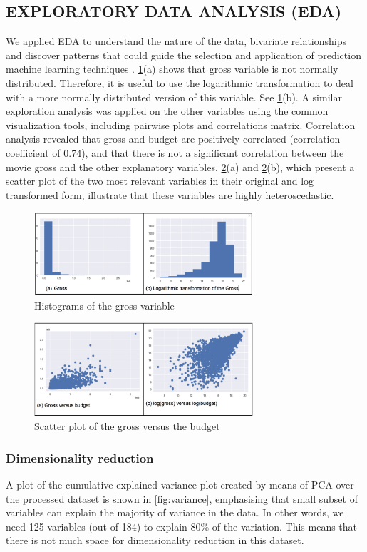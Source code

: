 \subsection{EXPLORATORY DATA ANALYSIS (EDA)}
We applied EDA to understand the nature of the data, bivariate relationships and discover patterns that could guide the selection and application of prediction machine learning techniques \cite{behrens1997principles}. \figurename{} \ref{fig:hist}(a) shows that gross variable is not normally distributed. Therefore, it is useful to use the logarithmic transformation to deal with a more normally distributed version of this variable. See \figurename{} \ref{fig:hist}(b). A similar exploration analysis was applied on the other variables using the common visualization tools, including pairwise plots and correlations matrix. Correlation analysis revealed that gross and budget are positively correlated (correlation coefficient of 0.74), and that there is not a significant correlation between the movie gross and the other explanatory variables. \figurename{} \ref{fig:scatter}(a) and \figurename{} \ref{fig:scatter}(b), which present a scatter plot of the two most relevant variables in their original and log transformed form, illustrate that these variables are highly heteroscedastic. 
\begin{figure}[h]
\centering
\includegraphics[width=3.2in]{figures/hist}
\caption{Histograms of the gross variable} 
\label{fig:hist}
\end{figure}
\begin{figure}[h]
\centering
\includegraphics[width=3.2in]{figures/scatter}
\caption{Scatter plot of the gross versus the budget} 
\label{fig:scatter}
\end{figure}

\subsubsection{Dimensionality reduction}
A plot of the cumulative explained variance plot created by means of PCA over the processed dataset is shown in \figurename{} \ref{fig:variance}, emphasising that small subset of variables can explain the majority of variance in the data. In other words, we need 125 variables (out of 184) to explain 80\% of the variation. This means that there is not much space for dimensionality reduction in this dataset.


